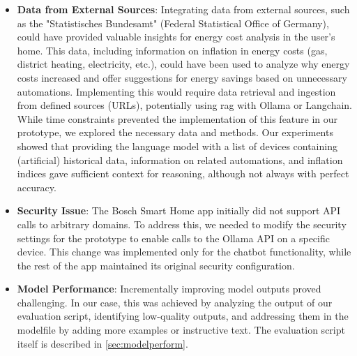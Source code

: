 \begin{itemize}
    \item \textbf{Data from External Sources}: Integrating data from external sources, such as the "Statistisches Bundesamt" (Federal Statistical Office of Germany), could have provided valuable insights for energy cost analysis in the user's home. This data, including information on inflation in energy costs (gas, district heating, electricity, etc.), could have been used to analyze why energy costs increased and offer suggestions for energy savings based on unnecessary automations. Implementing this would require data retrieval and ingestion from defined sources (URLs), potentially using \gls{rag} with Ollama or Langchain. While time constraints prevented the implementation of this feature in our prototype, we explored the necessary data and methods. Our experiments showed that providing the language model with a list of devices containing (artificial) historical data, information on related automations, and inflation indices gave sufficient context for reasoning, although not always with perfect accuracy.
    
    \item \textbf{Security Issue}: The Bosch Smart Home app initially did not support API calls to arbitrary domains. To address this, we needed to modify the security settings for the prototype to enable calls to the Ollama API on a specific device. This change was implemented only for the chatbot functionality, while the rest of the app maintained its original security configuration.

    \item \textbf{Model Performance}: Incrementally improving model outputs proved challenging. In our case, this was achieved by analyzing the output of our evaluation script, identifying low-quality outputs, and addressing them in the modelfile by adding more examples or instructive text. The evaluation script itself is described in \cref{sec:modelperform}.
\end{itemize}
